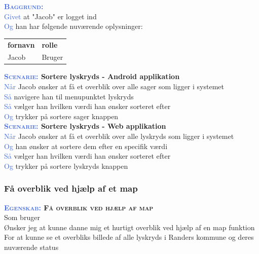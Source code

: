 \textsc{\textcolor{RoyalBlue}{\textbf{Baggrund:}}}\\
\textcolor{RoyalBlue}{Givet} at "Jacob" er logget ind\\
\textcolor{RoyalBlue}{Og} han har følgende nuværende oplysninger:\\
\begin{tabular}{| l | l |}
	\textbf{fornavn} & \textbf{rolle} \\
	Jacob & Bruger\\
\end{tabular}
\newline \newline

\textbf{\textsc{\textcolor{RoyalBlue}{Scenarie:}} Sortere lyskryds - Android applikation}\\
\textcolor{RoyalBlue}{Når} Jacob ønsker at få et overblik over alle sager som ligger i systemet\\
\textcolor{RoyalBlue}{Så} navigere han til menupunktet lyskryds\\
\textcolor{RoyalBlue}{Så} vælger han hvilken værdi han ønsker sorteret efter\\
\textcolor{RoyalBlue}{Og} trykker på sortere sager knappen\\

\textbf{\textsc{\textcolor{RoyalBlue}{Scenarie:}} Sortere lyskryds - Web applikation}\\
\textcolor{RoyalBlue}{Når} Jacob ønsker at få et overblik over alle lyskryds som ligger i systemet\\
\textcolor{RoyalBlue}{Og} han ønsker at sortere dem efter en specifik værdi\\
\textcolor{RoyalBlue}{Så} vælger han hvilken værdi han ønsker sorteret efter\\
\textcolor{RoyalBlue}{Og} trykker på sortere lyskryds knappen\\

\subsubsection{Få overblik ved hjælp af et map}
\textbf{\textsc{\textcolor{RoyalBlue}{Egenskab:} Få overblik ved hjælp af map}}\\
Som bruger\\
Ønsker jeg at kunne danne mig et hurtigt overblik ved hjælp af en map funktion\\
For at kunne se et overbliks billede af alle lyskryds i Randers kommune  og deres nuværende status\\

